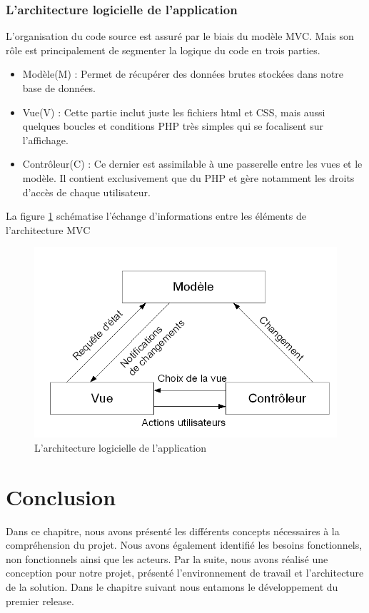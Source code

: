 \subsubsection{L'architecture  logicielle de l’application}
L’organisation du code source est assuré par le biais du modèle MVC. Mais son rôle est principalement de segmenter la logique du code en trois parties. 
\begin{itemize}
	\item Modèle(M) : Permet de récupérer des données brutes stockées dans notre base de données.
	\item Vue(V) : Cette partie inclut juste les fichiers html et CSS, mais aussi quelques boucles et conditions PHP très simples qui se focalisent sur l’affichage. 
	\item Contrôleur(C) : Ce dernier est assimilable à une passerelle entre les vues et le modèle. Il contient exclusivement que du PHP et gère notamment les droits d’accès de chaque utilisateur. 
\end{itemize}\newpage
La figure \ref{fig:mvc} schématise l’échange d’informations entre les éléments de l’architecture MVC
\begin{figure}[H]
	\centering
	\includegraphics[width=0.7\linewidth]{img/mvc}
	\caption[L'architecture logicielle de l’application]{L'architecture logicielle de l’application}
	\label{fig:mvc}
\end{figure}

\section*{Conclusion}
Dans ce chapitre, nous avons présenté les différents concepts nécessaires à la compréhension du projet. Nous avons également identifié les besoins fonctionnels, non fonctionnels ainsi que les acteurs. Par la suite, nous avons réalisé une conception pour notre projet, présenté l’environnement de travail et l’architecture de la solution. Dans le chapitre suivant nous entamons le développement du premier release.